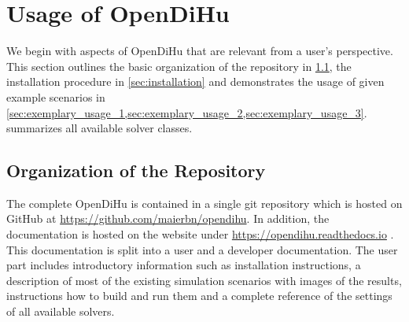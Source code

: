 
\section{Usage of OpenDiHu}\label{sec:usage}
We begin with aspects of OpenDiHu that are relevant from a user's perspective. This section outlines the basic organization of the repository in \cref{sec:organization_of_the_directory}, the installation procedure in \cref{sec:installation} and demonstrates the usage of given example scenarios in \cref{sec:exemplary_usage_1,sec:exemplary_usage_2,sec:exemplary_usage_3}.  summarizes all available solver classes.

\subsection{Organization of the Repository}\label{sec:organization_of_the_directory}
The complete OpenDiHu is contained in a single git repository which is hosted on GitHub at \url{https://github.com/maierbn/opendihu}. In addition, the documentation is hosted on the  website under \url{https://opendihu.readthedocs.io} \cite{opendihuWeb}. This documentation is split into a user and a developer documentation. The user part includes introductory information such as installation instructions, a description of most of the existing simulation scenarios with images of the results, instructions how to build and run them and a complete reference of the settings of all available solvers.

